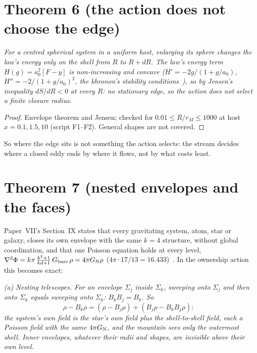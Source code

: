 \documentclass[twocolumn]{iopjournal}
\begin{document}

\section*{Theorem 6 (the action does not choose the edge)}

\emph{For a centred spherical system in a uniform host, enlarging its
sphere changes the law's energy only on the shell from $R$ to $R + dR$.
The law's energy term $H(g) = a_0^2[F - y]$ is non-increasing and
concave ($H' = -2g/(1+g/a_0)$, $H'' = -2/(1+g/a_0)^2$, the khronon's
stability conditions~\cite{NelsonKh}), so by Jensen's inequality
$dS/dR < 0$ at every $R$: no stationary edge, so the action does not
select a finite closure radius.}

\begin{proof}
Envelope theorem and Jensen; checked for $0.01 \le R/r_M \le 1000$
at host $x = 0.1, 1.5, 10$ (script F1--F2). General shapes are not
covered.
\end{proof}

So where the edge sits is not something the action selects: the
stream decides where a closed eddy ends by where it flows, not by what
costs least.


\section*{Theorem 7 (nested envelopes and the faces)}

Paper~VII's Section~IX states that every gravitating system, atom,
star or galaxy, closes its own envelope with the same $k = 4$
structure, without global coordination, and that one Poisson equation
holds at every level, $\nabla^2\Phi = k\pi\,\tfrac{k^2+1}{kd+1}\,
G_{\rm bare}\,\rho = 4\pi G_{\rm N}\rho$ ($4\pi\cdot17/13 =
16.433$)~\cite{NelsonVII}. In the ownership action this becomes exact:

\emph{(a) Nesting telescopes. For an envelope $\Sigma_j$ inside
$\Sigma_k$, sweeping onto $\Sigma_j$ and then onto $\Sigma_k$ equals
sweeping onto $\Sigma_k$: $B_kB_j = B_k$. So
\[
\rho - B_k\rho = (\rho - B_j\rho) + (B_j\rho - B_kB_j\rho):
\]
the system's own field is the star's own field plus the shell-to-shell
field, each a Poisson field with the same $4\pi G_{\rm N}$, and the
mountain sees only the outermost shell. Inner envelopes, whatever their
radii and shapes, are invisible above their own level.}
\end{document}
